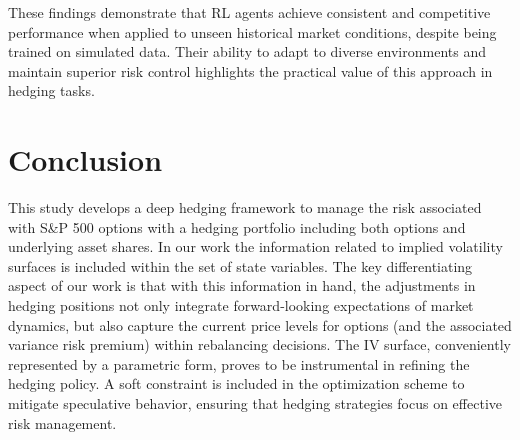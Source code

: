 \documentclass[12pt]{article}
\begin{document}
These findings demonstrate that RL agents achieve consistent and competitive performance when applied to unseen historical market conditions, despite being trained on simulated data. Their ability to adapt to diverse environments and maintain superior risk control highlights the practical value of this approach in hedging tasks.




\section{Conclusion}\label{se:conclusion}

This study develops
a deep hedging framework to manage the risk associated with S\&P 500 options with a hedging portfolio including both options and underlying asset shares. In our work the information related to implied volatility surfaces is included within the set of state variables. 
The key differentiating aspect of our work is that with this information in hand, the adjustments in hedging positions not only integrate forward-looking expectations of market dynamics, but also capture the current price levels for options (and the associated variance risk premium) within rebalancing decisions. The IV surface, conveniently represented by a parametric form, proves to be instrumental in refining the hedging policy. A soft constraint is included in the optimization scheme to mitigate speculative behavior, ensuring that hedging strategies focus on effective risk management.

\end{document}
